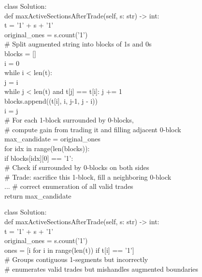 \begin{tcolorbox}[
    colback=green!5,
    colframe=green!60!black,
    title={\textbf{Pairwise-Selected Solution (idx=15): Correct \checkmark}},
    coltitle=white,
    fonttitle=\small\bfseries,
    breakable,
    enhanced
]
\small\ttfamily
class Solution:\\
\quad def maxActiveSectionsAfterTrade(self, s: str) -> int:\\
\quad\quad t = '1' + s + '1'\\
\quad\quad original\_ones = s.count('1')\\
\quad\quad \# Split augmented string into blocks of 1s and 0s\\
\quad\quad blocks = []\\
\quad\quad i = 0\\
\quad\quad while i < len(t):\\
\quad\quad\quad j = i\\
\quad\quad\quad while j < len(t) and t[j] == t[i]: j += 1\\
\quad\quad\quad blocks.append((t[i], i, j-1, j - i))\\
\quad\quad\quad i = j\\
\quad\quad \# For each 1-block surrounded by 0-blocks,\\
\quad\quad \# compute gain from trading it and filling adjacent 0-block\\
\quad\quad max\_candidate = original\_ones\\
\quad\quad for idx in range(len(blocks)):\\
\quad\quad\quad if blocks[idx][0] == '1':\\
\quad\quad\quad\quad \# Check if surrounded by 0-blocks on both sides\\
\quad\quad\quad\quad \# Trade: sacrifice this 1-block, fill a neighboring 0-block\\
\quad\quad\quad\quad ...  \# correct enumeration of all valid trades\\
\quad\quad return max\_candidate
\end{tcolorbox}

\begin{tcolorbox}[
    colback=red!5,
    colframe=red!60!black,
    title={\textbf{Pointwise-Selected Solution (idx=4): Incorrect \ding{55}}},
    coltitle=white,
    fonttitle=\small\bfseries,
    breakable,
    enhanced
]
\small\ttfamily
class Solution:\\
\quad def maxActiveSectionsAfterTrade(self, s: str) -> int:\\
\quad\quad t = '1' + s + '1'\\
\quad\quad original\_ones = s.count('1')\\
\quad\quad ones = [i for i in range(len(t)) if t[i] == '1']\\
\quad\quad \# Groups contiguous 1-segments but incorrectly\\
\quad\quad \# enumerates valid trades but mishandles augmented boundaries
\end{tcolorbox}

